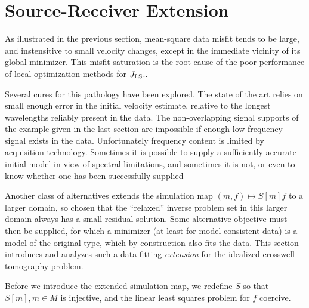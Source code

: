 \section{Source-Receiver Extension}

As illustrated in the previous section, mean-square data misfit tends
to be large, and instensitive to small
velocity changes, except in the immediate vicinity of its global
minimizer. This misfit saturation is the root cause of the poor
performance of local optimization methods for $J_{\rm LS}$..

Several cures for this pathology have been explored. The state of the
art relies on small enough error in the initial velocity estimate,
relative to the longest wavelengths reliably present in the data. The non-overlapping
signal supports of the example given in the last section are
impossible if enough low-frequency signal exists in the
data. Unfortunately frequency content is limited by acquisition
technology. Sometimes it is possible to supply a sufficiently
accurate initial model in view of spectral limitations, and sometimes
it is not, or even to know
whether one has been successfully supplied

Another class of alternatives extends the simulation map
$(m,f) \mapsto S[m]f$ to a larger domain, so chosen that the ``relaxed''
inverse problem set in this larger domain always has a small-residual
solution. Some alternative objective must then be supplied, for which
a minimizer (at least for model-consistent data) is a model of the
original type, which by construction also fits the data.
This section introduces and analyzes such a data-fitting {\em
  extension} for the idealized crosswell tomography problem.

Before we introduce the extended simulation map, we redefine $S$ so
that $S[m], m\in M$ is injective, and the linear least squares problem
for $f$ coercive.

